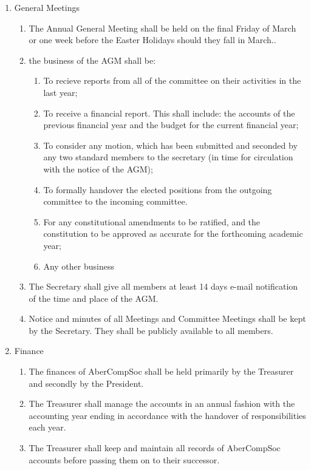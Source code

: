\documentclass{article}
\begin{document}
\begin{enumerate}
\begin{enumerate}
        \end{enumerate}
    \item General Meetings
        \begin{enumerate}
            \item The Annual General Meeting shall be held on the final Friday of March or one week before the Easter Holidays should they fall in March..
            \item the business of the AGM shall be:
                \begin{enumerate}
                    \item To recieve reports from all of the committee on their activities in the last year;
                    \item To receive a financial report. This shall include: the accounts of the previous financial year and the budget for the current financial year;
                    \item To consider any motion, which has been submitted and seconded by any two standard members to the secretary (in time for circulation with the notice of the AGM);
                    \item To formally handover the elected positions from the outgoing committee to the incoming committee.
                    \item For any constitutional amendments to be ratified, and the constitution to be approved as accurate for the forthcoming academic year;
                    \item Any other business
                \end{enumerate}
            \item The Secretary shall give all members at least 14 days e-mail notification of the time and place of the AGM.
            \item Notice and minutes of all Meetings and Committee Meetings shall be kept by the Secretary. They shall be publicly available to all members.
        \end{enumerate}
    \item Finance
        \begin{enumerate}
            \item The finances of AberCompSoc shall be held primarily by the Treasurer and secondly by the President.
            \item The Treasurer shall manage the accounts in an annual fashion with the accounting year ending in accordance with the handover of responsibilities each year.
            \item The Treasurer shall keep and maintain all records of AberCompSoc accounts before passing them on to their successor.

\end{enumerate}
\end{enumerate}
\end{document}
